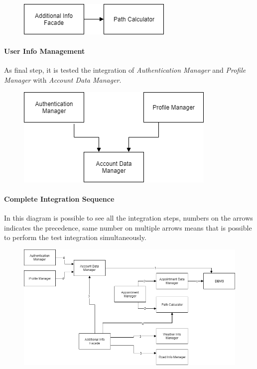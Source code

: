 \begin{figure}[H]
	\centering
	\includegraphics{Img/FourthStep}
\end{figure}

\paragraph*{User Info Management\\}
As final step, it is tested the integration of \emph{Authentication Manager} and \emph{Profile Manager} with \emph{Account Data Manager}.

\begin{figure}[H]
	\centering
	\includegraphics[scale=0.8]{Img/FifthStep}
\end{figure}

\paragraph*{Complete Integration Sequence\\}
In this diagram is possible to see all the integration steps, numbers on the arrows indicates the precedence, same number on multiple arrows means that is possible to perform the test integration simultaneously.

\begin{figure}[h]
	\centering
	\includegraphics[width=\textwidth, keepaspectratio=true]{Img/IntegrationSequence}
\end{figure}